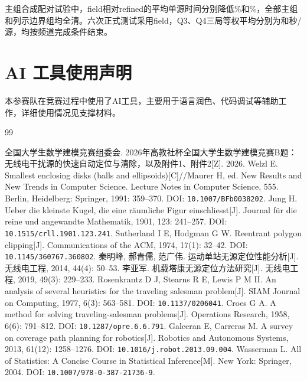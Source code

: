 \documentclass[UTF8,fontset=fandol,a4paper,zihao=-4]{ctexart}
\begin{document}
主组合成配对试验中，field相对refined的平均单源时间分别降低\QThreeGain\%和\QFourGain\%，全部主组和列示边界组均全清。六次正式测试采用field，Q3、Q4三局等权平均分别为\FormalThreeMean{}和\FormalFourMean{}秒/源，均按频道完成条件结束。

\clearpage
\section*{AI 工具使用声明}
本参赛队在竞赛过程中使用了AI工具，主要用于语言润色、代码调试等辅助工作，详细使用情况见支撑材料。
\thispagestyle{plain}
\clearpage
\begin{thebibliography}{99}
\raggedright
{} 全国大学生数学建模竞赛组委会. 2026年高教社杯全国大学生数学建模竞赛B题：无线电干扰源的快速自动定位与清除，以及附件1、附件2[Z]. 2026.
 Welzl E. Smallest enclosing disks (balls and ellipsoids)[C]//Maurer H, ed. New Results and New Trends in Computer Science. Lecture Notes in Computer Science, 555. Berlin, Heidelberg: Springer, 1991: 359--370. DOI: \nolinkurl{10.1007/BFb0038202}.
 Jung H. Ueber die kleinste Kugel, die eine räumliche Figur einschliesst[J]. Journal für die reine und angewandte Mathematik, 1901, 123: 241--257. DOI: \nolinkurl{10.1515/crll.1901.123.241}.
 Sutherland I E, Hodgman G W. Reentrant polygon clipping[J]. Communications of the ACM, 1974, 17(1): 32--42. DOI: \nolinkurl{10.1145/360767.360802}.
 秦明峰, 郝青儒, 范广伟. 运动单站无源定位性能分析[J]. 无线电工程, 2014, 44(4): 50--53.
 李亚军. 机载塔康无源定位方法研究[J]. 无线电工程, 2019, 49(3): 229--233.
 Rosenkrantz D J, Stearns R E, Lewis P M II. An analysis of several heuristics for the traveling salesman problem[J]. SIAM Journal on Computing, 1977, 6(3): 563--581. DOI: \nolinkurl{10.1137/0206041}.
 Croes G A. A method for solving traveling-salesman problems[J]. Operations Research, 1958, 6(6): 791--812. DOI: \nolinkurl{10.1287/opre.6.6.791}.
 Galceran E, Carreras M. A survey on coverage path planning for robotics[J]. Robotics and Autonomous Systems, 2013, 61(12): 1258--1276. DOI: \nolinkurl{10.1016/j.robot.2013.09.004}.
 Wasserman L. All of Statistics: A Concise Course in Statistical Inference[M]. New York: Springer, 2004. DOI: \nolinkurl{10.1007/978-0-387-21736-9}.
\end{thebibliography}
\clearpage
\appendix

\end{document}
